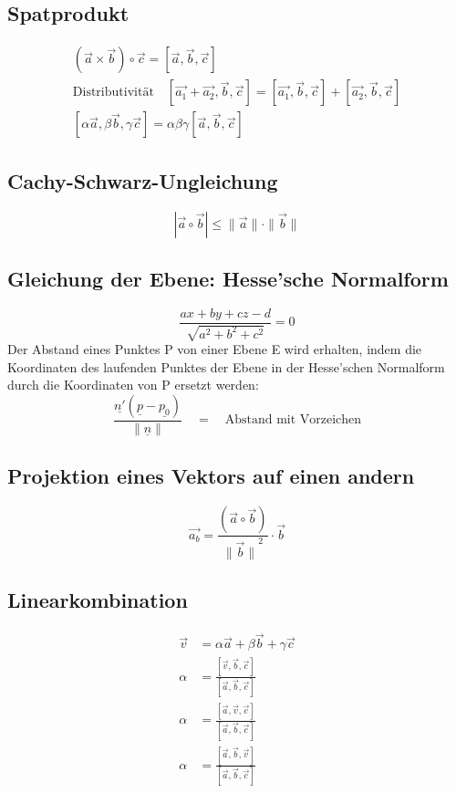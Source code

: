 \subsection{Spatprodukt}
\begin{gather}
  (\vec{a}\times\vec{b})\circ\vec{c} = [\vec{a}, \vec{b}, \vec{c}] \\
  \text{Distributivit\"at} \quad [\vec{a_1}+\vec{a_2}, \vec{b}, \vec{c}] = [\vec{a_1}, \vec{b}, \vec{c}] + [\vec{a_2}, \vec{b}, \vec{c}] \\
  [\alpha\vec{a}, \beta\vec{b}, \gamma\vec{c}] = \alpha\beta\gamma[\vec{a}, \vec{b}, \vec{c}]
\end{gather}


\subsection{Cachy-Schwarz-Ungleichung}
\begin{equation}
\left|\vec{a}\circ\vec{b}\right| \le \|\vec{a}\|\cdot\|\vec{b}\|
\end{equation}


\subsection{Gleichung der Ebene: Hesse'sche Normalform}
\begin{equation}
\frac{ax+by+cz-d}{\sqrt{a^2+b^2+c^2}} = 0
\end{equation}
Der Abstand eines Punktes P von einer Ebene E wird erhalten, indem
die Koordinaten des laufenden Punktes der Ebene in der Hesse'schen
Normalform durch die Koordinaten von P ersetzt werden:
\begin{equation}
\frac{\underline{n'}\left({\underline{p}-\underline{p_0}}\right)}{\|\underline{n}\|} \quad = \quad\text{Abstand mit Vorzeichen}
\end{equation}


\subsection{Projektion eines Vektors auf einen andern}
\begin{equation}
\vec{a_b} = \frac{\left({\vec{a}\circ\vec{b}}\right)}{{\|\vec{b}\|}^2}\cdot\vec{b}
\end{equation}


\subsection{Linearkombination}
\begin{align}
  \vec{v} &= \alpha\vec{a} + \beta\vec{b} + \gamma\vec{c} \\
  \alpha &= \frac{[\vec{v}, \vec{b}, \vec{c}]}{[\vec{a}, \vec{b}, \vec{c}]} \\
  \alpha &= \frac{[\vec{a}, \vec{v}, \vec{c}]}{[\vec{a}, \vec{b}, \vec{c}]} \\
  \alpha &= \frac{[\vec{a}, \vec{b}, \vec{v}]}{[\vec{a}, \vec{b}, \vec{c}]} \\
\end{align}


